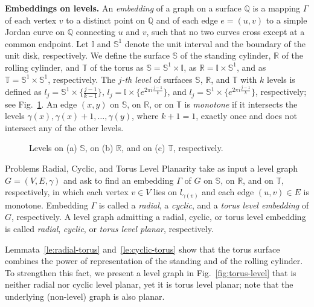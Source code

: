 \documentclass{llncs}
\begin{document}
\smallskip
\noindent
{\bf Embeddings on levels.} 
An {\em embedding} of a graph on a surface $\mathbb Q$ is a mapping $\Gamma$ of each vertex $v$ to a distinct point on $\mathbb Q$ and of each edge $e=(u,v)$ to a simple Jordan curve on $\mathbb Q$ connecting $u$ and $v$, such that no two curves cross except at a common endpoint. 
Let $\mathbb I$ and $\mathbb S^1$ denote the unit interval and the boundary of the unit disk, respectively.
We define the surface $\mathbb S$ of the standing cylinder, $\mathbb R$ of the rolling cylinder, and $\mathbb T$ of the torus
as $\mathbb S = \mathbb S^1 \times \mathbb I$,
as $\mathbb R = \mathbb I \times \mathbb S^1$, and 
as $\mathbb T = \mathbb S^1 \times \mathbb S^1$, respectively.
The {\em $j$-th level} of surfaces $\mathbb S$, $\mathbb R$, and $\mathbb T$ with $k$ levels is defined as
 $l_j = \mathbb S^1 \times \{\frac{j-1}{k-1}\}$,
  $l_j = \mathbb I \times \{e^{2\pi i \frac{j-1}{k}}\}$, and
 $l_j = \mathbb S^1 \times \{e^{2\pi i \frac{j-1}{k}}\}$, respectively; see Fig.~\ref{fig:levels}.
An edge $(x,y)$ on $\mathbb S$, on $\mathbb R$, or on $\mathbb T$ is {\em monotone} if it intersects the levels $\gamma(x), \gamma(x)+1, \dots, \gamma(y)$, where $k+1=1$, exactly once and does not intersect any of the other levels.



 \begin{figure}[tb!]
\centering
{}\hfil
{}\hfil
{}
\caption{Levels on (a) $\mathbb S$, on (b) $\mathbb R$, and on (c) $\mathbb T$, respectively.
} 
\label{fig:levels}
\end{figure}

Problems {\sc Radial}, {\sc Cyclic}, and {\sc Torus Level Planarity} take as input a level graph $G=(V,E,\gamma)$ and ask to find an embedding $\Gamma$ of $G$ on $\mathbb S$, on $\mathbb R$, and on $\mathbb T$, respectively, in which each vertex $v \in V$ lies on $l_{\gamma(v)}$ and each edge $(u,v) \in E$ is monotone. Embedding $\Gamma$ is called a {\em radial}, a {\em cyclic}, and a {\em torus level embedding} of $G$, respectively.
A level graph admitting a radial, cyclic, or torus level embedding is called {\em radial}, {\em cyclic}, or {\em torus level planar}, respectively.

Lemmata~\ref{le:radial-torus} and~\ref{le:cyclic-torus} show that the torus surface combines the power of representation of the standing and of the rolling cylinder. To strengthen this fact, we present a level graph in Fig.~\ref{fig:torus-level} that is neither radial nor cyclic level planar, yet it is torus level planar; note that the underlying (non-level) graph is also planar.
\end{document}

